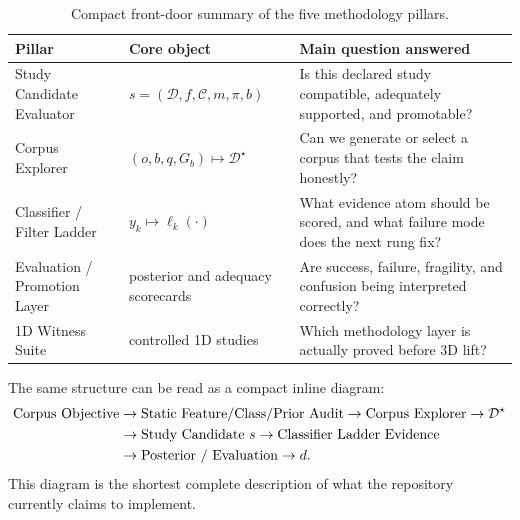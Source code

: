\documentclass[11pt]{article}
\begin{document}
\begin{table}[htbp]
\centering
\small
\caption{Compact front-door summary of the five methodology pillars.}
\label{tab:five_pillars_summary}
\begin{tabularx}{\textwidth}{lXX}
\toprule
Pillar & Core object & Main question answered \\
\midrule
Study Candidate Evaluator & \(s = (\mathcal{D}, f, \mathcal{C}, m, \pi, b)\) & Is this declared study compatible, adequately supported, and promotable? \\
Corpus Explorer & \((o, b, q, G_b) \mapsto \mathcal{D}^{\star}\) & Can we generate or select a corpus that tests the claim honestly? \\
Classifier / Filter Ladder & \(y_k \mapsto \ell_k(\cdot)\) & What evidence atom should be scored, and what failure mode does the next rung fix? \\
Evaluation / Promotion Layer & posterior and adequacy scorecards & Are success, failure, fragility, and confusion being interpreted correctly? \\
1D Witness Suite & controlled 1D studies & Which methodology layer is actually proved before 3D lift? \\
\bottomrule
\end{tabularx}
\end{table}

The same structure can be read as a compact inline diagram:
\begin{align}
\text{Corpus Objective}
&\rightarrow
\text{Static Feature/Class/Prior Audit}
\rightarrow
\text{Corpus Explorer}
\rightarrow
\mathcal{D}^{\star}
\notag \\
&\rightarrow
\text{Study Candidate } s
\rightarrow
\text{Classifier Ladder Evidence}
\notag \\
&\rightarrow
\text{Posterior / Evaluation}
\rightarrow
d.
\end{align}
This diagram is the shortest complete description of what the repository
currently claims to implement.
\end{document}

